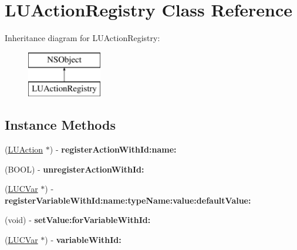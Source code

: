 \hypertarget{interface_l_u_action_registry}{}\section{L\+U\+Action\+Registry Class Reference}
\label{interface_l_u_action_registry}
Inheritance diagram for L\+U\+Action\+Registry\+:\begin{figure}[H]
\begin{center}
\leavevmode
\includegraphics[height=2.000000cm]{interface_l_u_action_registry}
\end{center}
\end{figure}
\subsection*{Instance Methods}
\begin{DoxyCompactItemize}
\item 
\mbox{\label{interface_l_u_action_registry_a4d69db3787e730378715f68fa1e544b6}} 
(\mbox{\hyperlink{interface_l_u_action}{L\+U\+Action}} $\ast$) -\/ {\bfseries register\+Action\+With\+Id\+:name\+:}
\item 
\mbox{\label{interface_l_u_action_registry_a1e0ffaa40fe63ee0292a8f151a894572}} 
(B\+O\+OL) -\/ {\bfseries unregister\+Action\+With\+Id\+:}
\item 
\mbox{\label{interface_l_u_action_registry_aadf81ac7e6017dfd2b27c57a2c878822}} 
(\mbox{\hyperlink{interface_l_u_c_var}{L\+U\+C\+Var}} $\ast$) -\/ {\bfseries register\+Variable\+With\+Id\+:name\+:type\+Name\+:value\+:default\+Value\+:}
\item 
\mbox{\label{interface_l_u_action_registry_a734f34ea5fa56efa678e9a1c6a5831f6}} 
(void) -\/ {\bfseries set\+Value\+:for\+Variable\+With\+Id\+:}
\item 
\mbox{\label{interface_l_u_action_registry_a38ac88e3be15a224c4d95e314de5f0bc}} 
(\mbox{\hyperlink{interface_l_u_c_var}{L\+U\+C\+Var}} $\ast$) -\/ {\bfseries variable\+With\+Id\+:}
\end{DoxyCompactItemize}
